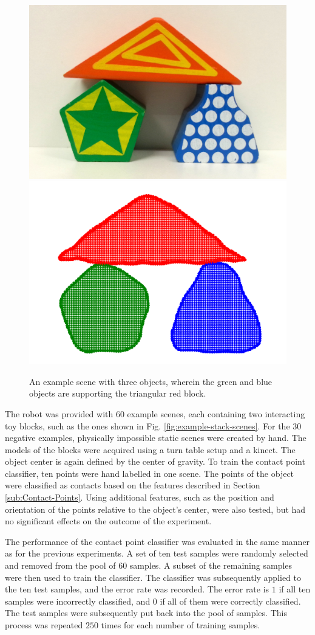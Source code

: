 \begin{figure}
\begin{centering}
\includegraphics[width=0.25\columnwidth]{oli/PicsforIROS2014/3BlockScene}\includegraphics[width=0.25\columnwidth]{oli/PicsforIROS2014/3Blocks}
\par\end{centering}

\caption{\label{fig:3-block-example-scene}An example scene with three objects,
wherein the green and blue objects are supporting the triangular red
block.}
\end{figure}
The robot was provided with $60$ example scenes, each containing two
interacting toy blocks, such as the ones shown in Fig. \ref{fig:example-stack-scenes}.
For the $30$ negative examples, physically impossible static scenes
were created by hand. The models of the blocks were acquired using
a turn table setup and a kinect. The object center is again defined
by the center of gravity. To train the contact point classifier, ten
points were hand labelled in one scene. The points of the object were
classified as contacts based on the features described in Section
\ref{sub:Contact-Points}. Using additional features, such as the
position and orientation of the points relative to the object's center,
were also tested, but had no significant effects on the outcome of
the experiment. 

The performance of the contact point classifier was evaluated in the
same manner as for the previous experiments. A set of ten test samples
were randomly selected and removed from the pool of $60$ samples. A
subset of the remaining samples were then used to train the classifier.
The classifier was subsequently applied to the ten test samples, and
the error rate was recorded. The error rate is $1$ if all ten samples
were incorrectly classified, and $0$ if all of them were correctly
classified. The test samples were subsequently put back into the pool
of samples. This process was repeated $250$ times for each number of
training samples. 

